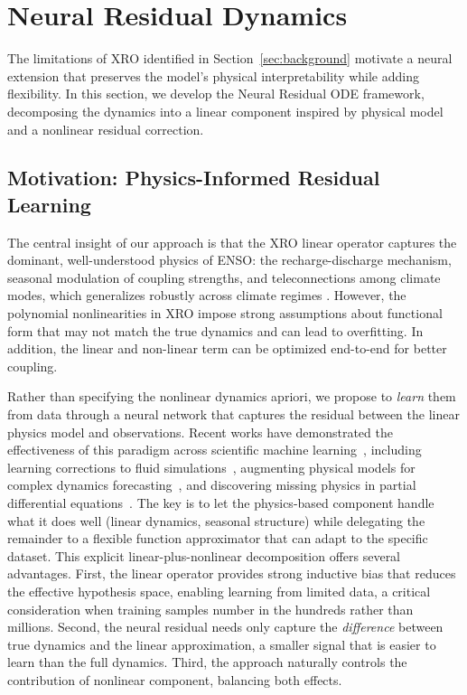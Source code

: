 \section{Neural Residual Dynamics}
\label{sec:neural_ode}

The limitations of XRO identified in Section~\ref{sec:background} motivate a neural extension that preserves the model's physical interpretability while adding flexibility. In this section, we develop the Neural Residual ODE framework, decomposing the dynamics into a linear component inspired by physical model and a nonlinear residual correction.

\subsection{Motivation: Physics-Informed Residual Learning}

The central insight of our approach is that the XRO linear operator captures the dominant, well-understood physics of ENSO: the recharge-discharge mechanism, seasonal modulation of coupling strengths, and teleconnections among climate modes, which generalizes robustly across climate regimes \cite{zhao2024xro}. However, the polynomial nonlinearities in XRO impose strong assumptions about functional form that may not match the true dynamics and can lead to overfitting. In addition, the linear and non-linear term can be optimized end-to-end for better coupling.

Rather than specifying the nonlinear dynamics apriori, we propose to \emph{learn} them from data through a neural network that captures the residual between the linear physics model and observations. Recent works have demonstrated the effectiveness of this paradigm across scientific machine learning~\cite{karniadakis2021physics,willard2023integrating}, including learning corrections to fluid simulations~\cite{um2020solver,list2022learned}, augmenting physical models for complex dynamics forecasting~\cite{yin2021augmenting}, and discovering missing physics in partial differential equations~\cite{raissi2019pinn}. The key is to let the physics-based component handle what it does well (linear dynamics, seasonal structure) while delegating the remainder to a flexible function approximator that can adapt to the specific dataset. This explicit linear-plus-nonlinear decomposition offers several advantages. First, the linear operator provides strong inductive bias that reduces the effective hypothesis space, enabling learning from limited data, a critical consideration when training samples number in the hundreds rather than millions. Second, the neural residual needs only capture the \emph{difference} between true dynamics and the linear approximation, a smaller signal that is easier to learn than the full dynamics. Third, the approach naturally controls the contribution of nonlinear component, balancing both effects.

